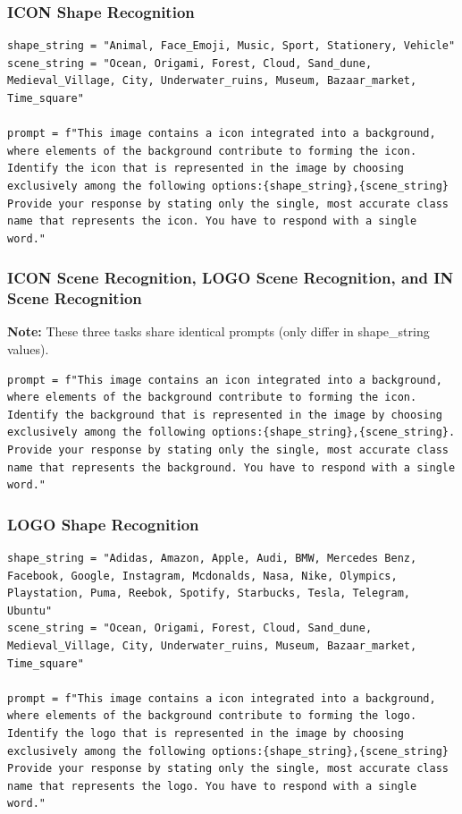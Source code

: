 \documentclass{article}
\theoremstyle{plain}
\theoremstyle{definition}
\theoremstyle{remark}
\begin{document}
\subsubsection{ICON Shape Recognition}

\begin{verbatim}
shape_string = "Animal, Face_Emoji, Music, Sport, Stationery, Vehicle"
scene_string = "Ocean, Origami, Forest, Cloud, Sand_dune,
Medieval_Village, City, Underwater_ruins, Museum, Bazaar_market,
Time_square"

prompt = f"This image contains a icon integrated into a background,
where elements of the background contribute to forming the icon.
Identify the icon that is represented in the image by choosing
exclusively among the following options:{shape_string},{scene_string}
Provide your response by stating only the single, most accurate class
name that represents the icon. You have to respond with a single word."
\end{verbatim}

\subsubsection{ICON Scene Recognition, LOGO Scene Recognition, and IN Scene Recognition}

\textbf{Note:} These three tasks share identical prompts (only differ in shape\_string values).

\begin{verbatim}
prompt = f"This image contains an icon integrated into a background,
where elements of the background contribute to forming the icon.
Identify the background that is represented in the image by choosing
exclusively among the following options:{shape_string},{scene_string}.
Provide your response by stating only the single, most accurate class
name that represents the background. You have to respond with a single
word."
\end{verbatim}

\subsubsection{LOGO Shape Recognition}

\begin{verbatim}
shape_string = "Adidas, Amazon, Apple, Audi, BMW, Mercedes Benz,
Facebook, Google, Instagram, Mcdonalds, Nasa, Nike, Olympics,
Playstation, Puma, Reebok, Spotify, Starbucks, Tesla, Telegram, Ubuntu"
scene_string = "Ocean, Origami, Forest, Cloud, Sand_dune,
Medieval_Village, City, Underwater_ruins, Museum, Bazaar_market,
Time_square"

prompt = f"This image contains a icon integrated into a background,
where elements of the background contribute to forming the logo.
Identify the logo that is represented in the image by choosing
exclusively among the following options:{shape_string},{scene_string}
Provide your response by stating only the single, most accurate class
name that represents the logo. You have to respond with a single word."
\end{verbatim}
\end{document}
